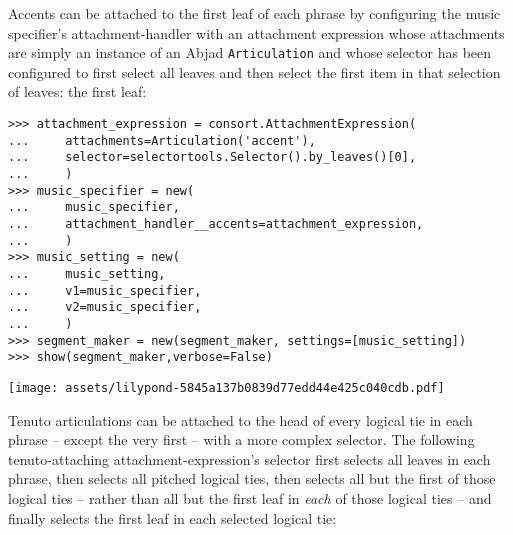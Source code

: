 \noindent Accents can be attached to the first leaf of each phrase by
configuring the music specifier's attachment-handler with an attachment
expression whose attachments are simply an instance of an Abjad
\texttt{Articulation} and whose selector has been configured to first select
all leaves and then select the first item in that selection of leaves: the
first leaf:

\begin{comment}
<abjad>[stylesheet=../consort.ily]
attachment_expression = consort.AttachmentExpression(
    attachments=Articulation('accent'),
    selector=selectortools.Selector().by_leaves()[0],
    )
music_specifier = new(
    music_specifier,
    attachment_handler__accents=attachment_expression,
    )
music_setting = new(
    music_setting,
    v1=music_specifier,
    v2=music_specifier,
    )
segment_maker = new(segment_maker, settings=[music_setting])
show(segment_maker,verbose=False)
</abjad>
\end{comment}

\begin{abjadbookoutput}
\begin{singlespacing}
\vspace{-0.5\baselineskip}
\begin{lstlisting}
>>> attachment_expression = consort.AttachmentExpression(
...     attachments=Articulation('accent'),
...     selector=selectortools.Selector().by_leaves()[0],
...     )
>>> music_specifier = new(
...     music_specifier,
...     attachment_handler__accents=attachment_expression,
...     )
>>> music_setting = new(
...     music_setting,
...     v1=music_specifier,
...     v2=music_specifier,
...     )
>>> segment_maker = new(segment_maker, settings=[music_setting])
>>> show(segment_maker,verbose=False)
\end{lstlisting}
\noindent\texttt{[image: assets/lilypond-5845a137b0839d77edd44e425c040cdb.pdf]}
\end{singlespacing}
\end{abjadbookoutput}

\noindent Tenuto articulations can be attached to the head of every logical tie
in each phrase -- except the very first -- with a more complex selector. The
following tenuto-attaching attachment-expression's selector first selects all
leaves in each phrase, then selects all pitched logical ties, then selects all
but the first of those logical ties -- rather than all but the first leaf in
\emph{each} of those logical ties -- and finally selects the first leaf in each
selected logical tie:

